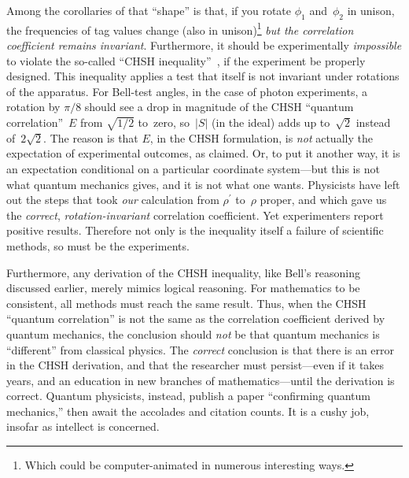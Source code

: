 \documentclass[9pt,technote]{IEEEtran}
\begin{document}
Among the corollaries of that ``shape'' is that, if you rotate
$\phi_1$ and~$\phi_2$ in unison, the frequencies of tag values change
(also in unison)\footnote{Which could be computer-animated in numerous
  interesting ways.} {\em{but the correlation coefficient remains
    invariant}}. Furthermore, it should be experimentally
{\em{impossible}} to violate the so-called ``CHSH
inequality''~\cite{enwiki:1170465048}, if the experiment be properly
designed. This inequality applies a test that itself is not invariant
under rotations of the apparatus. For Bell-test angles, in the case of
photon experiments, a rotation by $\pi\!/8$ should see a drop in
magnitude of the CHSH ``quantum correlation''~$E$ from $\sqrt{1\!/2}$
to~zero, so~$|S|$ (in the ideal) adds up to~$\sqrt2$ instead
of~$2\sqrt2$. The reason is that $E$, in the CHSH formulation, is
{\em{not}} actually the expectation of experimental outcomes, as
claimed. Or, to put it another way, it is an expectation conditional
on a particular coordinate system---but this is not what quantum
mechanics gives, and it is not what one wants. Physicists have left
out the steps that took {\em{our}} calculation from $\rho^{\prime}$
to~$\rho$ proper, and which gave us the {\em{correct}},
{\em{rotation-invariant}} correlation coefficient. Yet experimenters
report positive results. Therefore not only is the inequality itself a
failure of scientific methods, so must be the experiments.

Furthermore, any derivation of the CHSH inequality, like Bell's
reasoning discussed earlier, merely mimics logical reasoning. For
mathematics to be consistent, all methods must reach the same
result. Thus, when the CHSH ``quantum correlation'' is not the same as
the correlation coefficient derived by quantum mechanics, the
conclusion should {\em{not}} be that quantum mechanics is
``different'' from classical physics. The {\em{correct}} conclusion is
that there is an error in the CHSH derivation, and that the researcher
must persist---even if it takes years, and an education in new
branches of mathematics---until the derivation is correct. Quantum
physicists, instead, publish a paper ``confirming quantum mechanics,''
then await the accolades and citation counts. It is a cushy job,
insofar as intellect is concerned.
\end{document}
